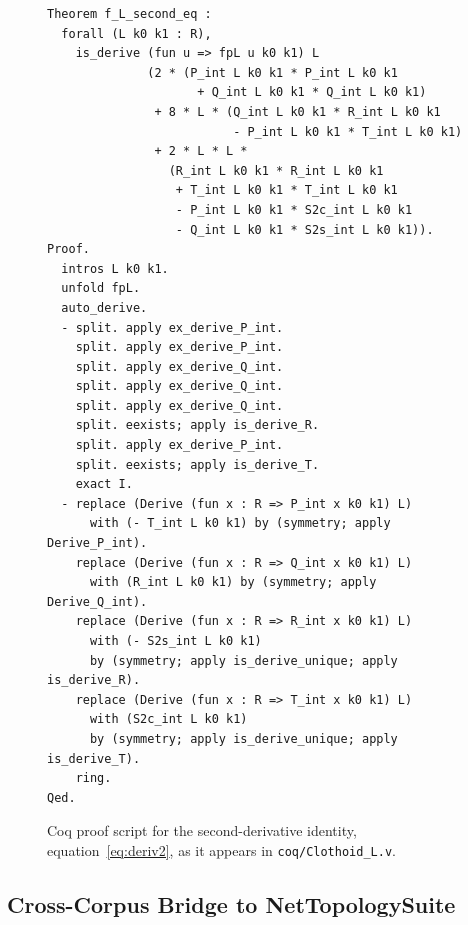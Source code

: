 \documentclass[11pt,a4paper]{article}
\begin{document}
\begin{figure}[H]
\small
\begin{verbatim}
Theorem f_L_second_eq :
  forall (L k0 k1 : R),
    is_derive (fun u => fpL u k0 k1) L
              (2 * (P_int L k0 k1 * P_int L k0 k1
                     + Q_int L k0 k1 * Q_int L k0 k1)
               + 8 * L * (Q_int L k0 k1 * R_int L k0 k1
                          - P_int L k0 k1 * T_int L k0 k1)
               + 2 * L * L *
                 (R_int L k0 k1 * R_int L k0 k1
                  + T_int L k0 k1 * T_int L k0 k1
                  - P_int L k0 k1 * S2c_int L k0 k1
                  - Q_int L k0 k1 * S2s_int L k0 k1)).
Proof.
  intros L k0 k1.
  unfold fpL.
  auto_derive.
  - split. apply ex_derive_P_int.
    split. apply ex_derive_P_int.
    split. apply ex_derive_Q_int.
    split. apply ex_derive_Q_int.
    split. apply ex_derive_Q_int.
    split. eexists; apply is_derive_R.
    split. apply ex_derive_P_int.
    split. eexists; apply is_derive_T.
    exact I.
  - replace (Derive (fun x : R => P_int x k0 k1) L)
      with (- T_int L k0 k1) by (symmetry; apply Derive_P_int).
    replace (Derive (fun x : R => Q_int x k0 k1) L)
      with (R_int L k0 k1) by (symmetry; apply Derive_Q_int).
    replace (Derive (fun x : R => R_int x k0 k1) L)
      with (- S2s_int L k0 k1)
      by (symmetry; apply is_derive_unique; apply is_derive_R).
    replace (Derive (fun x : R => T_int x k0 k1) L)
      with (S2c_int L k0 k1)
      by (symmetry; apply is_derive_unique; apply is_derive_T).
    ring.
Qed.
\end{verbatim}
\caption{Coq proof script for the second-derivative identity, equation~\eqref{eq:deriv2}, as it appears in \texttt{coq/Clothoid\_L.v}.}
\label{lst:coq}
\end{figure}

\subsection{Cross-Corpus Bridge to NetTopologySuite}
\label{sec:bridge}
\end{document}
